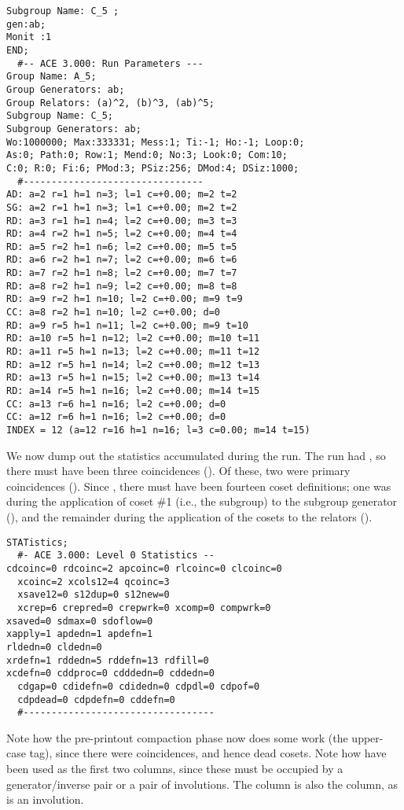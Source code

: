 \bv\begin{verbatim}
Subgroup Name: C_5 ;
gen:ab;
Monit :1
END;
  #-- ACE 3.000: Run Parameters ---
Group Name: A_5;
Group Generators: ab;
Group Relators: (a)^2, (b)^3, (ab)^5;
Subgroup Name: C_5;
Subgroup Generators: ab;
Wo:1000000; Max:333331; Mess:1; Ti:-1; Ho:-1; Loop:0;
As:0; Path:0; Row:1; Mend:0; No:3; Look:0; Com:10;
C:0; R:0; Fi:6; PMod:3; PSiz:256; DMod:4; DSiz:1000;
  #--------------------------------
AD: a=2 r=1 h=1 n=3; l=1 c=+0.00; m=2 t=2
SG: a=2 r=1 h=1 n=3; l=1 c=+0.00; m=2 t=2
RD: a=3 r=1 h=1 n=4; l=2 c=+0.00; m=3 t=3
RD: a=4 r=2 h=1 n=5; l=2 c=+0.00; m=4 t=4
RD: a=5 r=2 h=1 n=6; l=2 c=+0.00; m=5 t=5
RD: a=6 r=2 h=1 n=7; l=2 c=+0.00; m=6 t=6
RD: a=7 r=2 h=1 n=8; l=2 c=+0.00; m=7 t=7
RD: a=8 r=2 h=1 n=9; l=2 c=+0.00; m=8 t=8
RD: a=9 r=2 h=1 n=10; l=2 c=+0.00; m=9 t=9
CC: a=8 r=2 h=1 n=10; l=2 c=+0.00; d=0
RD: a=9 r=5 h=1 n=11; l=2 c=+0.00; m=9 t=10
RD: a=10 r=5 h=1 n=12; l=2 c=+0.00; m=10 t=11
RD: a=11 r=5 h=1 n=13; l=2 c=+0.00; m=11 t=12
RD: a=12 r=5 h=1 n=14; l=2 c=+0.00; m=12 t=13
RD: a=13 r=5 h=1 n=15; l=2 c=+0.00; m=13 t=14
RD: a=14 r=5 h=1 n=16; l=2 c=+0.00; m=14 t=15
CC: a=13 r=6 h=1 n=16; l=2 c=+0.00; d=0
CC: a=12 r=6 h=1 n=16; l=2 c=+0.00; d=0
INDEX = 12 (a=12 r=16 h=1 n=16; l=3 c=0.00; m=14 t=15)
\end{verbatim}\ev

We now dump out the statistics accumulated during the run.
The run had  \amp {}, so there must have been three
  coincidences ().
Of these, two were primary coincidences ().
Since , there must have been fourteen coset definitions;  one
  was during the application of coset \#1 (i.e., the subgroup) to the
  subgroup generator (), and the remainder during the
  application of the cosets to the relators ().

\bv\begin{verbatim}
STATistics;
  #- ACE 3.000: Level 0 Statistics --
cdcoinc=0 rdcoinc=2 apcoinc=0 rlcoinc=0 clcoinc=0
  xcoinc=2 xcols12=4 qcoinc=3
  xsave12=0 s12dup=0 s12new=0
  xcrep=6 crepred=0 crepwrk=0 xcomp=0 compwrk=0
xsaved=0 sdmax=0 sdoflow=0
xapply=1 apdedn=1 apdefn=1
rldedn=0 cldedn=0
xrdefn=1 rddedn=5 rddefn=13 rdfill=0
xcdefn=0 cddproc=0 cdddedn=0 cddedn=0
  cdgap=0 cdidefn=0 cdidedn=0 cdpdl=0 cdpof=0
  cdpdead=0 cdpdefn=0 cddefn=0
  #----------------------------------
\end{verbatim}\ev

Note how the pre-printout compaction phase now does some work (the
  upper-case  tag), since there were coincidences, and hence dead
  cosets.
Note how  have been used as the first two columns, since these
  must be occupied by a generator/inverse pair or a pair of involutions.
The  column is also the  column, as  is an
  involution.

